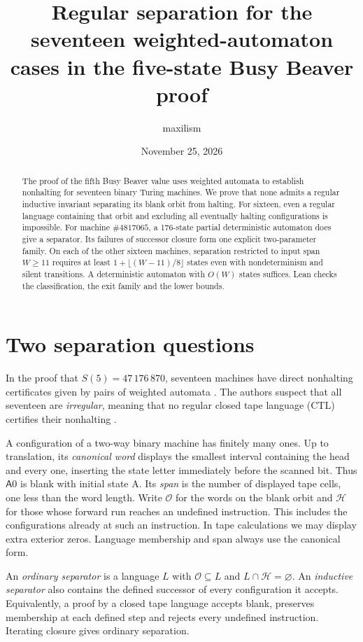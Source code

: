 \documentclass[11pt]{article}
\title{Regular separation for the seventeen weighted-automaton cases in the five-state Busy Beaver proof}
\author{maxilism}
\date{November 25, 2026}
\newcommand{\state}[1]{\mathsf{#1}}
\newcommand{\orb}{\mathcal O}
\newcommand{\halts}{\mathcal H}
\begin{document}
\maketitle

\begin{abstract}
The proof of the fifth Busy Beaver value uses weighted automata to establish nonhalting for seventeen binary Turing machines. We prove that none admits a regular inductive invariant separating its blank orbit from halting. For sixteen, even a regular language containing that orbit and excluding all eventually halting configurations is impossible. For machine \(\#4817065\), a 176-state partial deterministic automaton does give a separator. Its failures of successor closure form one explicit two-parameter family. On each of the other sixteen machines, separation restricted to input span \(W\ge11\) requires at least \(1+\lfloor(W-11)/8\rfloor\) states even with nondeterminism and silent transitions. A deterministic automaton with \(O(W)\) states suffices. Lean checks the classification, the exit family and the lower bounds.
\end{abstract}

\section{Two separation questions}

In the proof that \(S(5)=47\,176\,870\), seventeen machines have direct nonhalting certificates given by pairs of weighted automata \cite{coq,weights}. The authors suspect that all seventeen are \emph{irregular}, meaning that no regular closed tape language (CTL) certifies their nonhalting \cite[\S\S4.2, 4.6.2, 4.7]{bb5}.

A configuration of a two-way binary machine has finitely many ones. Up to translation, its \emph{canonical word} displays the smallest interval containing the head and every one, inserting the state letter immediately before the scanned bit. Thus \(\state A0\) is blank with initial state A. Its \emph{span} is the number of displayed tape cells, one less than the word length. Write \(\orb\) for the words on the blank orbit and \(\halts\) for those whose forward run reaches an undefined instruction. This includes the configurations already at such an instruction. In tape calculations we may display extra exterior zeros. Language membership and span always use the canonical form.

An \emph{ordinary separator} is a language \(L\) with \(\orb\subseteq L\) and \(L\cap\halts=\varnothing\). An \emph{inductive separator} also contains the defined successor of every configuration it accepts. Equivalently, a proof by a closed tape language accepts blank, preserves membership at each defined step and rejects every undefined instruction. Iterating closure gives ordinary separation.
\end{document}
